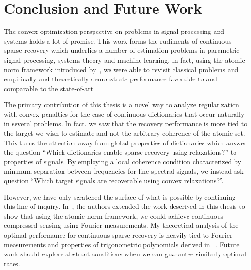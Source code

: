 \chapter{Conclusion and Future Work} %
\label{chap:conclusion}

The convex optimization perspective on problems in signal processing and systems
holds a lot of promise. This work forms the rudiments of continuous sparse
recovery which underlies a number of estimation problems in parametric signal
processing, systems theory and machine learning. In fact, using the atomic norm
framework introduced by~\cite{crpw}, we were able to revisit classical problems
and empirically and theoretically demonstrate performance favorable to and
comparable to the state-of-art.

The primary contribution of this thesis is a novel way to analyze regularization
with convex penalties for the case of continuous dictionaries that occur
naturally in several problems. In fact, we saw that the recovery performance is
more tied to the target we wish to estimate and not the arbitrary coherence of
the atomic set. This turns the attention away from global properties of
dictionaries which answer the question ``Which dictionaries enable sparse
recovery using relaxations?'' to properties of signals. By employing a local
coherence condition characterized by minimum separation between frequencies for
line spectral signals, we instead ask question ``Which target signals are
recoverable using convex relaxations?''. 

However, we have only scratched the surface of what is possible by continuing
this line of inquiry. In~\cite{cs_otg}, the authors extended the work descrived
in this thesis to show that using the atomic norm framework, we could achieve
continuous compressed sensing using Fourier measurements. My theoretical
analysis of the optimal performance for continuous sparse recovery is heavily
tied to Fourier measurements and properties of trigonometric polynomials derived
in ~\cite{cg_exact12,cg_noisy}. Future work should explore abstract conditions
when we can guarantee similarly optimal rates.

